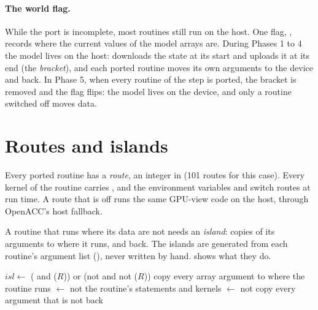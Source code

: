 \paragraph{The world flag.} While the port is incomplete, most routines still run on the host. One flag,
, records where the current values of the model arrays are. During Phases 1 to 4 the model
lives on the host:  downloads the state at its start and uploads it at its end (the \emph{bracket}),
and each ported routine moves its own arguments to the device and back. In Phase 5, when every routine of the step is
ported, the bracket is removed and the flag flips: the model lives on the device, and only a routine switched off
moves data.

\section{Routes and islands}

Every ported routine has a \emph{route}, an integer  in  (101 routes
for this case). Every kernel of the routine carries , and the environment variables
 and  switch routes at run time. A route that is off runs the same GPU-view code
on the host, through OpenACC's host fallback.

A routine that runs where its data are not needs an \emph{island}: copies of its arguments to where it runs, and
back. The islands are generated from each routine's argument list (), never written by
hand.  shows what they do.

\begin{algorithm}[ht]
\caption{The island of a routine with route $R$ (generated; GPU view only).}
\label{alg:island}
\begin{algorithmic}[1]
\State $\mathit{isl} \gets$ ( and ($R$)) or (not  and not ($R$))
 
  \State copy every array argument to where the routine runs
  \State {} $\gets$ not  
\EndIf
\State the routine's statements and kernels
 
  \State {} $\gets$ not 
  \State copy every argument that is not  back
\EndIf
\end{algorithmic}
\end{algorithm}

